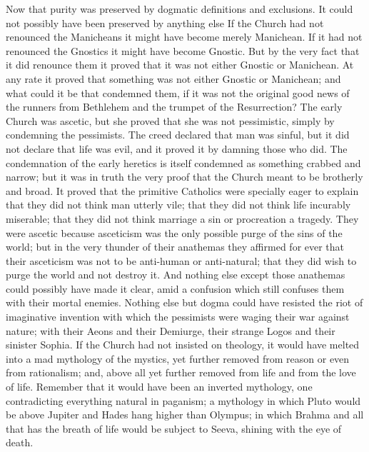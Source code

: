 Now that purity was preserved by dogmatic definitions and exclusions. It could not possibly have been preserved by anything else If the Church had not renounced the Manicheans it might have become merely Manichean. If it had not renounced the Gnostics it might have become Gnostic. But by the very fact that it did renounce them it proved that it was not either Gnostic or Manichean. At any rate it proved that something was not either Gnostic or Manichean; and what could it be that condemned them, if it was not the original good news of the runners from Bethlehem and the trumpet of the Resurrection? The early Church was ascetic, but she proved that she was not pessimistic, simply by condemning the pessimists. The creed declared that man was sinful, but it did not declare that life was evil, and it proved it by damning those who did. The condemnation of the early heretics is itself condemned as something crabbed and narrow; but it was in truth the very proof that the Church meant to be brotherly and broad. It proved that the primitive Catholics were specially eager to explain that they did not think man utterly vile; that they did not think life incurably miserable; that they did not think marriage a sin or procreation a tragedy. They were ascetic because asceticism was the only possible purge of the sins of the world; but in the very thunder of their anathemas they affirmed for ever that their asceticism was not to be anti-human or anti-natural; that they did wish to purge the world and not destroy it. And nothing else except those anathemas could possibly have made it clear, amid a confusion which still confuses them with their mortal enemies. Nothing else but dogma could have resisted the riot of imaginative invention with which the pessimists were waging their war against nature; with their Aeons and their Demiurge, their strange Logos and their sinister Sophia. If the Church had not insisted on theology, it would have melted into a mad mythology of the mystics, yet further removed from reason or even from rationalism; and, above all yet further removed from life and from the love of life. Remember that it would have been an inverted mythology, one contradicting everything natural in paganism; a mythology in which Pluto would be above Jupiter and Hades hang higher than Olympus; in which Brahma and all that has the breath of life would be subject to Seeva, shining with the eye of death.

